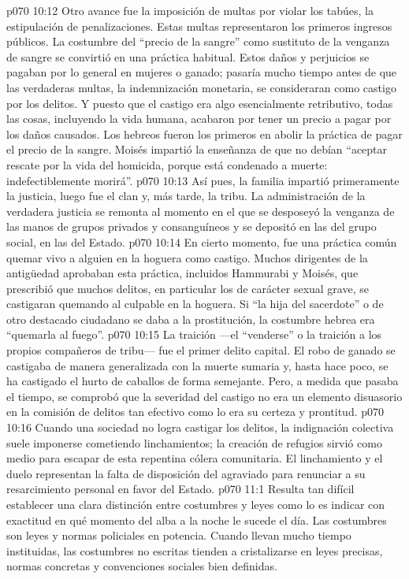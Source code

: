 \vs p070 10:12 Otro avance fue la imposición de multas por violar los tabúes, la estipulación de penalizaciones. Estas multas representaron los primeros ingresos públicos. La costumbre del “precio de la sangre” como sustituto de la venganza de sangre se convirtió en una práctica habitual. Estos daños y perjuicios se pagaban por lo general en mujeres o ganado; pasaría mucho tiempo antes de que las verdaderas multas, la indemnización monetaria, se consideraran como castigo por los delitos. Y puesto que el castigo era algo esencialmente retributivo, todas las cosas, incluyendo la vida humana, acabaron por tener un precio a pagar por los daños causados. Los hebreos fueron los primeros en abolir la práctica de pagar el precio de la sangre. Moisés impartió la enseñanza de que no debían “aceptar rescate por la vida del homicida, porque está condenado a muerte: indefectiblemente morirá”.
\vs p070 10:13 \pc Así pues, la familia impartió primeramente la justicia, luego fue el clan y, más tarde, la tribu. La administración de la verdadera justicia se remonta al momento en el que se desposeyó la venganza de las manos de grupos privados y consanguíneos y se depositó en las del grupo social, en las del Estado.
\vs p070 10:14 \pc En cierto momento, fue una práctica común quemar vivo a alguien en la hoguera como castigo. Muchos dirigentes de la antigüedad aprobaban esta práctica, incluidos Hammurabi y Moisés, que prescribió que muchos delitos, en particular los de carácter sexual grave, se castigaran quemando al culpable en la hoguera. Si “la hija del sacerdote” o de otro destacado ciudadano se daba a la prostitución, la costumbre hebrea era “quemarla al fuego”.
\vs p070 10:15 La traición ---el “venderse” o la traición a los propios compañeros de tribu--- fue el primer delito capital. El robo de ganado se castigaba de manera generalizada con la muerte sumaria y, hasta hace poco, se ha castigado el hurto de caballos de forma semejante. Pero, a medida que pasaba el tiempo, se comprobó que la severidad del castigo no era un elemento disuasorio en la comisión de delitos tan efectivo como lo era su certeza y prontitud.
\vs p070 10:16 Cuando una sociedad no logra castigar los delitos, la indignación colectiva suele imponerse cometiendo linchamientos; la creación de refugios sirvió como medio para escapar de esta repentina cólera comunitaria. El linchamiento y el duelo representan la falta de disposición del agraviado para renunciar a su resarcimiento personal en favor del Estado.
\vs p070 11:1 Resulta tan difícil establecer una clara distinción entre costumbres y leyes como lo es indicar con exactitud en qué momento del alba a la noche le sucede el día. Las costumbres son leyes y normas policiales en potencia. Cuando llevan mucho tiempo instituidas, las costumbres no escritas tienden a cristalizarse en leyes precisas, normas concretas y convenciones sociales bien definidas.
